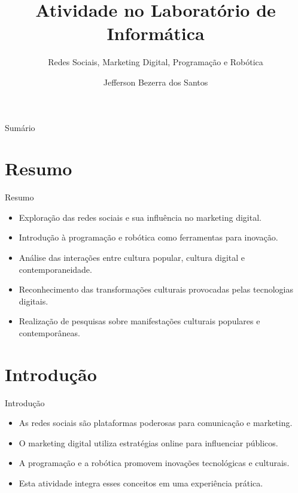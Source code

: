 \documentclass{beamer}
\title{Atividade no Laboratório de Informática}
\subtitle{Redes Sociais, Marketing Digital, Programação e Robótica}
\author{Jefferson Bezerra dos Santos }
\date{}
\begin{document}
\begin{frame}
    \titlepage
\end{frame}

\begin{frame}{Sumário}
    \tableofcontents
\end{frame}

\section{Resumo}
\begin{frame}{Resumo}
    \begin{itemize}
        \item Exploração das redes sociais e sua influência no marketing digital.
        \item Introdução à programação e robótica como ferramentas para inovação.
        \item Análise das interações entre cultura popular, cultura digital e contemporaneidade.
        \item Reconhecimento das transformações culturais provocadas pelas tecnologias digitais.
        \item Realização de pesquisas sobre manifestações culturais populares e contemporâneas.
    \end{itemize}
\end{frame}

\section{Introdução}
\begin{frame}{Introdução}
    \begin{itemize}
        \item As redes sociais são plataformas poderosas para comunicação e marketing.
        \item O marketing digital utiliza estratégias online para influenciar públicos.
        \item A programação e a robótica promovem inovações tecnológicas e culturais.
        \item Esta atividade integra esses conceitos em uma experiência prática.
    \end{itemize}
\end{frame}
\end{document}

